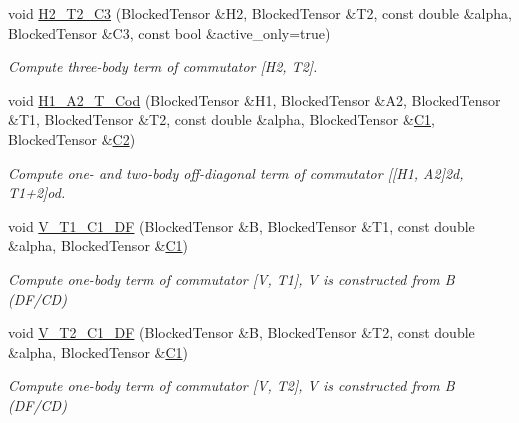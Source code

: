 \begin{DoxyCompactItemize}
void \mbox{\hyperlink{classforte_1_1_m_a_s_t_e_r___d_s_r_g_af283b5833cb6b33ec6b5fea49bb8dd3c}{H2\+\_\+\+T2\+\_\+\+C3}} (Blocked\+Tensor \&H2, Blocked\+Tensor \&T2, const double \&alpha, Blocked\+Tensor \&C3, const bool \&active\+\_\+only=true)
\begin{DoxyCompactList}\small\item\em Compute three-\/body term of commutator \mbox{[}H2, T2\mbox{]}. \end{DoxyCompactList}\item 
void \mbox{\hyperlink{classforte_1_1_m_a_s_t_e_r___d_s_r_g_a0be012ac81de463a27159cd21e332828}{H1\+\_\+\+A2\+\_\+\+T\+\_\+\+Cod}} (Blocked\+Tensor \&H1, Blocked\+Tensor \&A2, Blocked\+Tensor \&T1, Blocked\+Tensor \&T2, const double \&alpha, Blocked\+Tensor \&\mbox{\hyperlink{namespaceforte_abe00ec86d0015c0f2b6ac298c6e428e4a1a2ddc2db4693cfd16d534cde5572cc1}{C1}}, Blocked\+Tensor \&\mbox{\hyperlink{namespaceforte_abe00ec86d0015c0f2b6ac298c6e428e4af1a543f5a2c5d49bc5dde298fcf716e4}{C2}})
\begin{DoxyCompactList}\small\item\em Compute one-\/ and two-\/body off-\/diagonal term of commutator \mbox{[}\mbox{[}H1, A2\mbox{]}2d, T1+2\mbox{]}od. \end{DoxyCompactList}\item 
void \mbox{\hyperlink{classforte_1_1_m_a_s_t_e_r___d_s_r_g_a2814822e5c86a6ff5b173d7a530a8ff6}{V\+\_\+\+T1\+\_\+\+C1\+\_\+\+DF}} (Blocked\+Tensor \&B, Blocked\+Tensor \&T1, const double \&alpha, Blocked\+Tensor \&\mbox{\hyperlink{namespaceforte_abe00ec86d0015c0f2b6ac298c6e428e4a1a2ddc2db4693cfd16d534cde5572cc1}{C1}})
\begin{DoxyCompactList}\small\item\em Compute one-\/body term of commutator \mbox{[}V, T1\mbox{]}, V is constructed from B (D\+F/\+CD) \end{DoxyCompactList}\item 
void \mbox{\hyperlink{classforte_1_1_m_a_s_t_e_r___d_s_r_g_a557d951b2dc9232e4941cf98ed4c63f9}{V\+\_\+\+T2\+\_\+\+C1\+\_\+\+DF}} (Blocked\+Tensor \&B, Blocked\+Tensor \&T2, const double \&alpha, Blocked\+Tensor \&\mbox{\hyperlink{namespaceforte_abe00ec86d0015c0f2b6ac298c6e428e4a1a2ddc2db4693cfd16d534cde5572cc1}{C1}})
\begin{DoxyCompactList}\small\item\em Compute one-\/body term of commutator \mbox{[}V, T2\mbox{]}, V is constructed from B (D\+F/\+CD) \end{DoxyCompactList}\item 

\end{DoxyCompactItemize}
